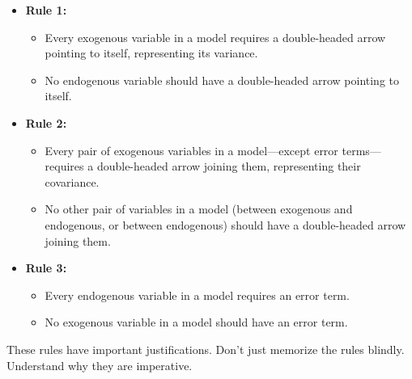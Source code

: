 \documentclass[
]{book}
\providecommand{\tightlist}{%
  \setlength{\itemsep}{0pt}\setlength{\parskip}{0pt}}
\begin{document}
\begin{itemize}
\tightlist
\item
  \textbf{Rule 1:}

  \begin{itemize}
  \tightlist
  \item
    Every exogenous variable in a model requires a double-headed arrow pointing to itself, representing its variance.
  \item
    No endogenous variable should have a double-headed arrow pointing to itself.
  \end{itemize}
\item
  \textbf{Rule 2:}

  \begin{itemize}
  \tightlist
  \item
    Every pair of exogenous variables in a model---except error terms---requires a double-headed arrow joining them, representing their covariance.
  \item
    No other pair of variables in a model (between exogenous and endogenous, or between endogenous) should have a double-headed arrow joining them.
  \end{itemize}
\item
  \textbf{Rule 3:}

  \begin{itemize}
  \tightlist
  \item
    Every endogenous variable in a model requires an error term.
  \item
    No exogenous variable in a model should have an error term.
  \end{itemize}
\end{itemize}

These rules have important justifications. Don't just memorize the rules blindly. Understand why they are imperative.
\end{document}
